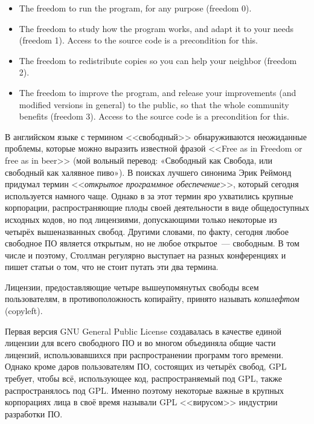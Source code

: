 \begin{itemize}
    \item The freedom to run the program, for any purpose (freedom 0).
    \item The freedom to study how the program works, and adapt it to your needs (freedom 1). Access to the source code is a precondition for this. 
    \item The freedom to redistribute copies so you can help your neighbor (freedom 2). 
    \item The freedom to improve the program, and release your improvements (and modified versions in general) to the public, so that the whole community benefits (freedom 3). Access to the source code is a precondition for this.
\end{itemize}


В английском языке с термином <<свободный>> обнаруживаются неожиданные проблемы, которые можно выразить известной фразой <<Free as in Freedom or free as in beer>> (мой вольный перевод: «Свободный как Свобода, или свободный как халявное пиво»).
В поисках лучшего синонима Эрик Реймонд придумал термин <<\emph{открытое программное обеспечение}>>, который сегодня используется намного чаще.
Однако в за этот термин яро ухватились крупные корпорации, распространяющие плоды своей деятельности в виде общедоступных исходных кодов, но под лицензиями, допускающими только некоторые из четырёх вышеназванных свобод.
Другими словами, по факту, сегодня любое свободное ПО является открытым, но не любое открытое~--- свободным.
В том числе и поэтому, Столлман регулярно выступает на разных конференциях и пишет статьи о том, что не стоит путать эти два термина.

Лицензии, предоставляющие четыре вышеупомянутых свободы всем пользователям, в противоположность копирайту, принято называть \emph{копилефтом} (copyleft).

Первая версия GNU General Public License создавалась в качестве единой лицензии для всего свободного ПО и во многом объединяла общие части лицензий, использовавшихся при распространении программ того времени.
Однако кроме даров пользователям ПО, состоящих из четырёх свобод, GPL требует, чтобы всё, использующее код, распространяемый под GPL, также распространялось под GPL.
Именно поэтому некоторые важные в крупных корпорациях лица в своё время называли GPL <<вирусом>> индустрии разработки ПО.

